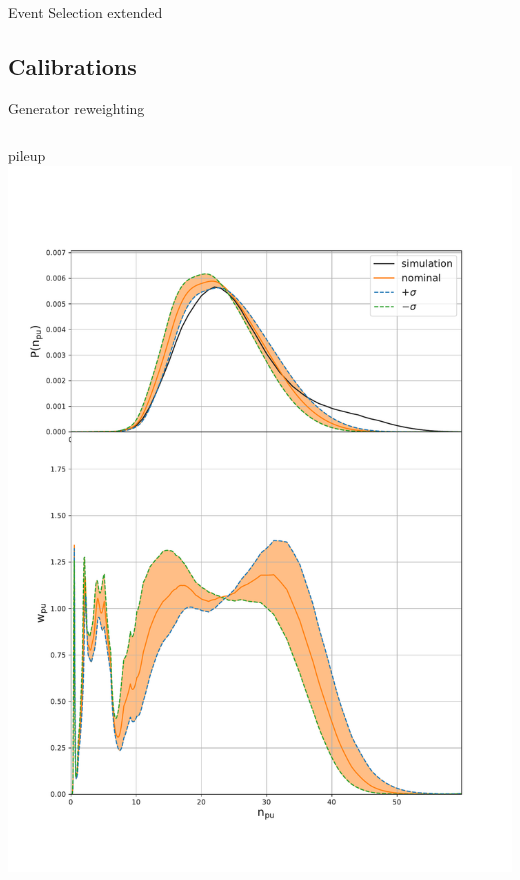 \begin{frame}{Event Selection extended}
    \begin{table}
        \centering
        \setlength{\tabcolsep}{1em}
        \renewcommand{\arraystretch}{2}
        \resizebox{0.99\textwidth}{!}{}
    \end{table}
\end{frame}



\subsection{Calibrations}

\begin{frame}{Generator reweighting}
\smaller
    \begin{columns}
        \begin{block}{pileup}
            \includegraphics[width=\textwidth]{chapters/Analysis/sectionCalibration/figures/generator/pileup_systematics.pdf}
        \end{block}
        

\end{columns}
\end{frame}
